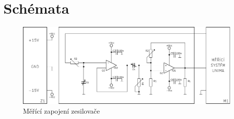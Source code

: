 \section*{Schémata}
  \begin{figure}[H]
    \centering
    \includegraphics[width=18cm]{../img/nf_zes.pdf}
    \caption{Měřící zapojení zesilovače}
    \label{sch:1}
  \end{figure}
  
 
  

